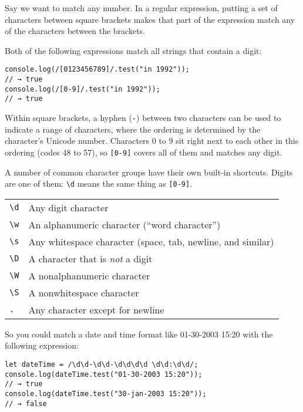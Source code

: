 Say we want to match any number. In a regular expression, putting a set of characters between square brackets makes that part of the expression match any of the characters between the brackets.

Both of the following expressions match all strings that contain a digit:

\begin{lstlisting}
console.log(/[0123456789]/.test("in 1992"));
// → true
console.log(/[0-9]/.test("in 1992"));
// → true
\end{lstlisting}
\noindent{}

Within square brackets, a hyphen (\lstinline`-`) between two characters can be used to indicate a range of characters, where the ordering is determined by the character's Unicode number. Characters 0 to 9 sit right next to each other in this ordering (codes 48 to 57), so \lstinline`[0-9]` covers all of them and matches any digit.

A number of common character groups have their own built-in shortcuts. Digits are one of them: \lstinline`\d` means the same thing as \lstinline`[0-9]`.

\noindent\begin{tabular}{ll}
\lstinline`\d` &
Any \index{digit}digit character
\tabularnewline
\lstinline`\w` &
An alphanumeric character (``\index{word character}word character'')
\tabularnewline
\lstinline`\s` &
Any whitespace character (space, tab, newline, and similar)
\tabularnewline
\lstinline`\D` &
A character that is \emph{not} a digit
\tabularnewline
\lstinline`\W` &
A nonalphanumeric character
\tabularnewline
\lstinline`\S` &
A nonwhitespace character
\tabularnewline
\lstinline`.` &
Any character except for newline
\tabularnewline
\end{tabular}

So you could match a date and time format like 01-30-2003 15:20 with the following expression:

\begin{lstlisting}
let dateTime = /\d\d-\d\d-\d\d\d\d \d\d:\d\d/;
console.log(dateTime.test("01-30-2003 15:20"));
// → true
console.log(dateTime.test("30-jan-2003 15:20"));
// → false
\end{lstlisting}
\noindent{}

